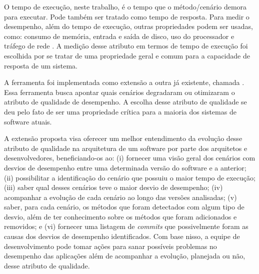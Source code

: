 O tempo de execução, neste trabalho, é o tempo que o método/cenário demora para executar. Pode também ser tratado como tempo de resposta. Para medir o desempenho, além do tempo de execução, outras propriedades podem ser usadas, como: consumo de memória, entrada e saída de disco, uso do processador e tráfego de rede \cite{Malik2013}. A medição desse atributo em termos de tempo de execução foi escolhida por se tratar de uma propriedade geral e comum para a capacidade de resposta de um sistema.


A ferramenta foi implementada como extensão a outra já existente, chamada \textit{\perfMinerName} \cite{Pinto2015}. Essa ferramenta busca apontar quais cenários degradaram ou otimizaram o atributo de qualidade de desempenho. A escolha desse atributo de qualidade se deu pelo fato de ser uma propriedade crítica para a maioria dos sistemas de software atuais.

A extensão proposta visa oferecer um melhor entendimento da evolução desse atributo de qualidade na arquitetura de um software por parte dos arquitetos e desenvolvedores, beneficiando-os ao: (i) fornecer uma visão geral dos cenários com desvios de desempenho entre uma determinada versão do software e a anterior; (ii) possibilitar a identificação do cenário que possuiu o maior tempo de execução; (iii) saber qual desses cenários teve o maior desvio de desempenho; (iv) acompanhar a evolução de cada cenário ao longo das versões analisadas; (v) saber, para cada cenário, os métodos que foram detectados com algum tipo de desvio, além de ter conhecimento sobre os métodos que foram adicionados e removidos; e (vi) fornecer uma listagem de \textit{commits} que possivelmente foram as causas dos desvios de desempenho identificados. Com base nisso, a equipe de desenvolvimento pode tomar ações para sanar possíveis problemas no desempenho das aplicações além de acompanhar a evolução, planejada ou não, desse atributo de qualidade.



